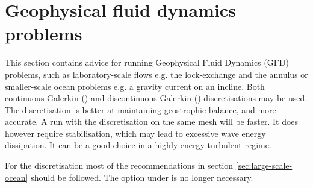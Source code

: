 
\section{Geophysical fluid dynamics problems}
\label{sec:gfd_problems}

This section contains advice for running Geophysical Fluid Dynamics (GFD) problems, such as laboratory-scale flows e.g. the lock-exchange and the annulus or smaller-scale ocean problems e.g. a gravity current on an incline. 
  Both continuous-Galerkin (\Poo) and discontinuous-Galerkin (\PoDGPt)
discretisations may be used. The \PoDGPt discretisation is better at
maintaining geostrophic balance, and more accurate. A run with the \Poo
discretisation on the same mesh will be faster. It does however require
stabilisation, which may lead to excessive wave energy dissipation. It can be a
good choice in a highly-energy turbulent regime.

For the \PoDGPt discretisation most of the recommendations in section
\ref{sec:large-scale-ocean} should be followed. The option
 under  is no longer
necessary.

